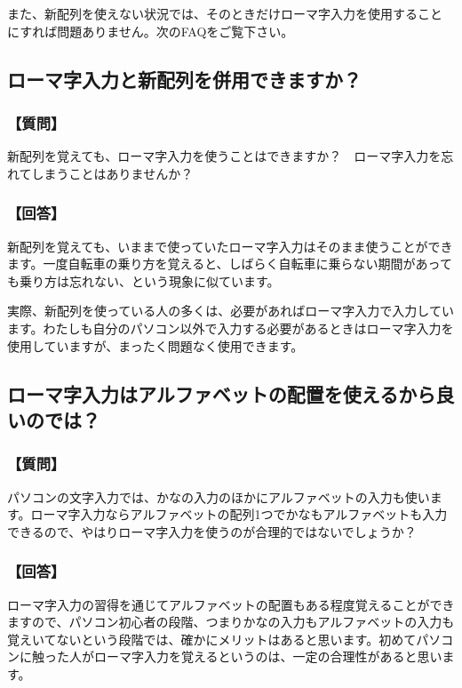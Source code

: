 また、新配列を使えない状況では、そのときだけローマ字入力を使用することにすれば問題ありません。次のFAQをご覧下さい。

\subsection{ローマ字入力と新配列を併用できますか？}

\subsubsection*{【質問】}

新配列を覚えても、ローマ字入力を使うことはできますか？　ローマ字入力を忘れてしまうことはありませんか？

\subsubsection*{【回答】}

新配列を覚えても、いままで使っていたローマ字入力はそのまま使うことができます。一度自転車の乗り方を覚えると、しばらく自転車に乗らない期間があっても乗り方は忘れない、という現象に似ています。

実際、新配列を使っている人の多くは、必要があればローマ字入力で入力しています。わたしも自分のパソコン以外で入力する必要があるときはローマ字入力を使用していますが、まったく問題なく使用できます。

\subsection{ローマ字入力はアルファベットの配置を使えるから良いのでは？}

\subsubsection*{【質問】}

パソコンの文字入力では、かなの入力のほかにアルファベットの入力も使います。ローマ字入力ならアルファベットの配列1つでかなもアルファベットも入力できるので、やはりローマ字入力を使うのが合理的ではないでしょうか？

\subsubsection*{【回答】}

ローマ字入力の習得を通じてアルファベットの配置もある程度覚えることができますので、パソコン初心者の段階、つまりかなの入力もアルファベットの入力も覚えいてないという段階では、確かにメリットはあると思います。初めてパソコンに触った人がローマ字入力を覚えるというのは、一定の合理性があると思います。

